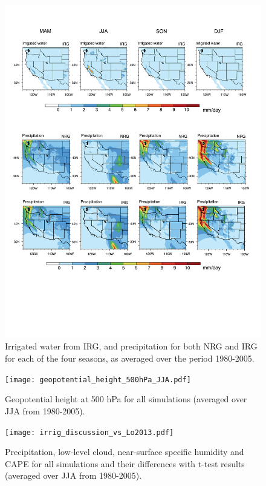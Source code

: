 \documentclass[draft,ms]{agutexSI}
\begin{document}
 
\begin{figure}
\begin{center}
\includegraphics[width=6in]{irrigated_water_and_precipitation_4seasons.pdf}
\caption{Irrigated water from IRG, and precipitation for both NRG and IRG for each of the four seasons, as averaged over the period 1980-2005.}
\end{center}
\end{figure}

\begin{figure}
\begin{center}
\texttt{[image: geopotential\_height\_500hPa\_JJA.pdf]}
\caption{Geopotential height at 500 hPa for all simulations (averaged over JJA from 1980-2005).}
\end{center}
\end{figure}

\begin{figure}
\begin{center}
\texttt{[image: irrig\_discussion\_vs\_Lo2013.pdf]}
\caption{Precipitation, low-level cloud, near-surface specific humidity and CAPE for all simulations and their differences with t-test results (averaged over JJA from 1980-2005).}
\end{center}
\end{figure}
\end{document}
